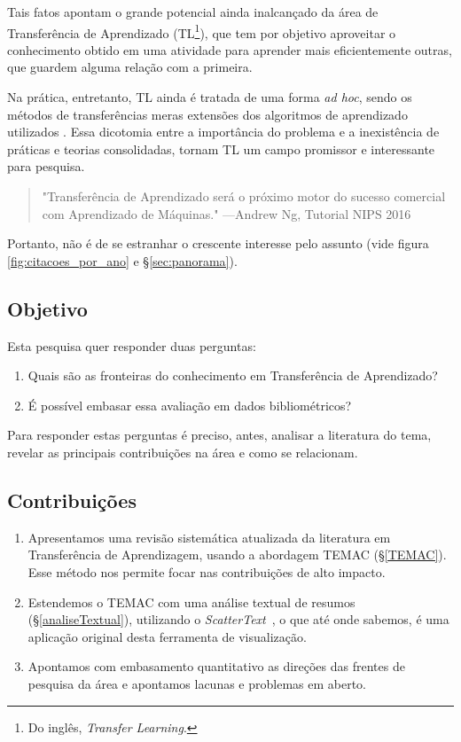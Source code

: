 \documentclass[sigconf]{acmart}
\begin{document}
  Tais fatos apontam  o grande potencial ainda inalcançado da área de Transferência de Aprendizado (TL\footnote{Do inglês, \emph{Transfer Learning}.}), que tem por objetivo aproveitar o conhecimento obtido em uma atividade para aprender mais eficientemente outras, que guardem alguma relação com a primeira.
  
  Na prática, entretanto, TL ainda é tratada de uma forma \textit{ad hoc}, sendo os métodos de transferências meras extensões dos algoritmos de aprendizado utilizados \cite{torrey}. Essa dicotomia entre a importância do problema e a inexistência de práticas e teorias consolidadas, tornam TL um campo promissor e interessante para pesquisa. 
  
  \begin{quote} "Transferência de Aprendizado será o próximo motor do sucesso comercial com Aprendizado de Máquinas." \hfill ---Andrew Ng, Tutorial NIPS 2016 \cite{ANg}
  \end{quote}

  Portanto, não é de se estranhar o crescente interesse pelo assunto (vide figura \ref{fig:citacoes_por_ano} e \S\ref{sec:panorama}).  

  \subsection{Objetivo}
   Esta pesquisa quer responder duas perguntas:
    \begin{enumerate}
      \item{Quais são as fronteiras do conhecimento em Transferência de Aprendizado?}
      \item {É possível embasar essa avaliação em dados bibliométricos?}
    \end{enumerate}
    Para responder estas perguntas é preciso, antes, analisar a literatura do tema, revelar as principais contribuições na área e como se relacionam.
  
  \subsection{Contribuições}

    \begin{enumerate}[C1.]
      \item Apresentamos uma revisão sistemática atualizada da literatura em Transferência de Aprendizagem, usando a abordagem TEMAC (\S \ref{TEMAC}). Esse método nos permite focar nas contribuições de alto impacto. 
      \item Estendemos o TEMAC com uma análise textual de resumos (\S \ref{analiseTextual}), utilizando o \emph{ScatterText}~\cite{kessler2017scattertext}, o que até onde sabemos, é uma aplicação original desta ferramenta de visualização.
      \item Apontamos com embasamento quantitativo as direções das frentes de pesquisa da área e apontamos lacunas e problemas em aberto.
    \end{enumerate}
  
\end{document}
